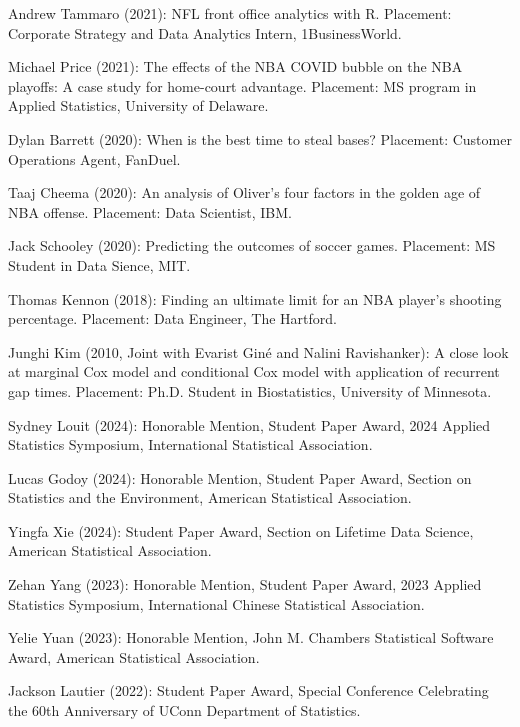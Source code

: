 \documentclass[Statistics]{vita}
\begin{document}
\begin{vita}
\begin{Students}
\begin{UndergraduateHonor}
    \item Andrew Tammaro (2021): NFL front office analytics with R. Placement: Corporate Strategy and Data Analytics Intern, 1BusinessWorld.
    \item Michael Price (2021): The effects of the NBA COVID bubble on the NBA playoffs: A case study for home-court advantage. Placement: MS program in Applied Statistics, University of Delaware.
    \item Dylan Barrett (2020): When is the best time to steal bases? Placement: Customer Operations Agent, FanDuel.
    \item Taaj Cheema (2020): An analysis of Oliver’s four factors in the golden age of NBA offense. Placement: Data Scientist, IBM.
    \item Jack Schooley (2020): Predicting the outcomes of soccer games. Placement: MS Student in Data Sience, MIT.
    \item Thomas Kennon (2018): Finding an ultimate limit for an NBA player's shooting percentage. Placement: Data Engineer, The Hartford.
    \item Junghi Kim (2010, Joint with Evarist Gin\'e and Nalini Ravishanker): A close look at marginal Cox model and conditional Cox model with application of recurrent gap times. Placement: Ph.D. Student in Biostatistics, University of Minnesota.
    \end{UndergraduateHonor}
  \end{Students}
  \begin{TeachingAccomplishments}
    \begin{StudentAwards}
    \item Sydney Louit (2024): Honorable Mention, Student Paper Award, 2024 Applied Statistics Symposium, International Statistical Association.
    \item Lucas Godoy (2024): Honorable Mention, Student Paper Award, Section on Statistics and the Environment, American Statistical Association.
    \item Yingfa Xie (2024): Student Paper Award, Section on Lifetime Data Science, American Statistical Association.
    \item Zehan Yang (2023): Honorable Mention, Student Paper Award, 2023 Applied Statistics Symposium, International Chinese Statistical Association.
    \item Yelie Yuan (2023): Honorable Mention, John M. Chambers Statistical Software Award, American Statistical Association.
    \item Jackson Lautier (2022): Student Paper Award, Special Conference Celebrating the 60th Anniversary of UConn Department of Statistics.

\end{StudentAwards}
\end{TeachingAccomplishments}
\end{vita}
\end{document}
